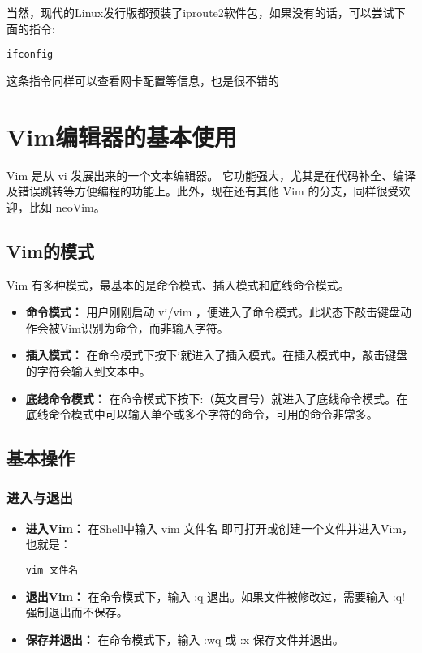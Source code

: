 \documentclass[UTF8]{gyh}
\begin{document}
\newpage
当然，现代的Linux发行版都预装了iproute2软件包，如果没有的话，可以尝试下面的指令:

\begin{lstlisting}
ifconfig
\end{lstlisting}

这条指令同样可以查看网卡配置等信息，也是很不错的


\section{Vim编辑器的基本使用}

Vim 是从 vi 发展出来的一个文本编辑器。 它功能强大，尤其是在代码补全、编译及错误跳转等方便编程的功能上。此外，现在还有其他 Vim 的分支，同样很受欢迎，比如 neoVim。

\subsection{Vim的模式}

Vim 有多种模式，最基本的是命令模式、插入模式和底线命令模式。

\begin{itemize}
\item \textbf{命令模式：} 用户刚刚启动  vi/vim ，便进入了命令模式。此状态下敲击键盘动作会被Vim识别为命令，而非输入字符。
\item \textbf{插入模式：} 在命令模式下按下i就进入了插入模式。在插入模式中，敲击键盘的字符会输入到文本中。
\item \textbf{底线命令模式：} 在命令模式下按下:（英文冒号）就进入了底线命令模式。在底线命令模式中可以输入单个或多个字符的命令，可用的命令非常多。
\end{itemize}

\subsection{基本操作}

\subsubsection{进入与退出}

\begin{itemize}
\item \textbf{进入Vim：} 在Shell中输入 vim 文件名 即可打开或创建一个文件并进入Vim，也就是：

\begin{lstlisting}
vim 文件名
\end{lstlisting}

\item \textbf{退出Vim：} 在命令模式下，输入 :q 退出。如果文件被修改过，需要输入 :q! 强制退出而不保存。
\item \textbf{保存并退出：} 在命令模式下，输入 :wq 或 :x 保存文件并退出。
\end{itemize}
\end{document}
